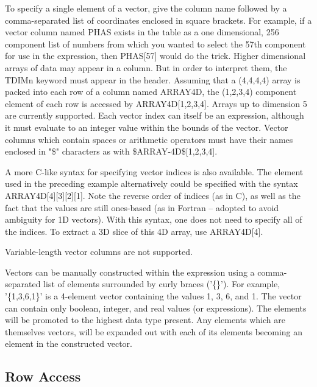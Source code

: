 \documentclass[11pt]{book}
\begin{document}
    To  specify  a  single  element  of  a  vector, give the column name
    followed by  a  comma-separated  list  of  coordinates  enclosed  in
    square  brackets.  For example, if a vector column named PHAS exists
    in the table as a one dimensional, 256  component  list  of  numbers
    from  which  you  wanted to select the 57th component for use in the
    expression, then PHAS[57] would do the  trick.   Higher  dimensional
    arrays  of  data  may appear in a column.  But in order to interpret
    them, the TDIMn keyword must appear in the header.  Assuming that  a
    (4,4,4,4)  array  is packed into each row of a column named ARRAY4D,
    the  (1,2,3,4)  component  element  of  each  row  is  accessed   by
    ARRAY4D[1,2,3,4].    Arrays   up   to   dimension  5  are  currently
    supported.  Each vector index can itself be an expression,  although
    it  must  evaluate  to  an  integer  value  within the bounds of the
    vector.  Vector columns which contain spaces or arithmetic operators
    must   have   their   names  enclosed  in  "\$"  characters  as  with
    \$ARRAY-4D\$[1,2,3,4].

    A  more  C-like  syntax  for  specifying  vector  indices  is   also
    available.   The element used in the preceding example alternatively
    could be specified with the syntax  ARRAY4D[4][3][2][1].   Note  the
    reverse  order  of  indices  (as in C), as well as the fact that the
    values are still ones-based (as  in  Fortran  --  adopted  to  avoid
    ambiguity  for  1D vectors).  With this syntax, one does not need to
    specify all of the indices.  To  extract  a  3D  slice  of  this  4D
    array, use ARRAY4D[4].

    Variable-length vector columns are not supported.

    Vectors can  be manually constructed  within the expression  using a
    comma-separated list of  elements surrounded by curly braces ('\{\}').
    For example, '\{1,3,6,1\}' is a 4-element vector containing the values
    1, 3, 6, and 1.  The  vector can contain  only boolean, integer, and
    real values (or expressions).  The elements will  be promoted to the
    highest  data type   present.  Any   elements   which  are themselves
    vectors, will be expanded out with  each of its elements becoming an
    element in the constructed vector.

\subsection{Row Access}
\end{document}
